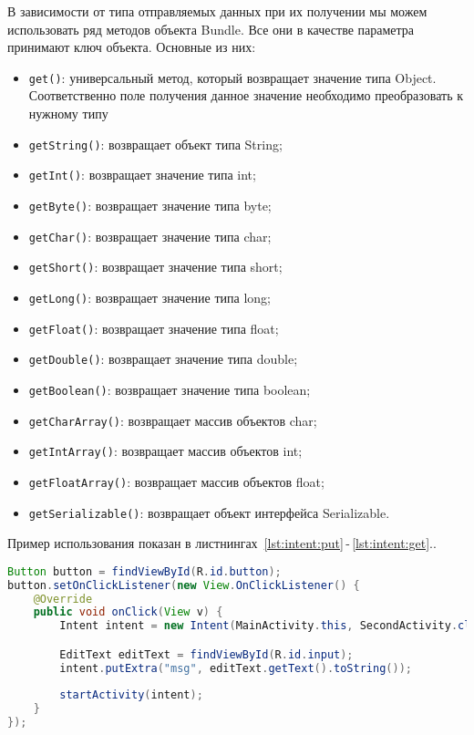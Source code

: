 В зависимости от типа отправляемых данных при их получении мы можем
использовать ряд методов объекта Bundle. Все они в качестве параметра
принимают ключ объекта. Основные из них:
\begin{itemize}
	\item \texttt{get()}: универсальный метод, который возвращает значение типа
		Object. Соответственно поле получения данное значение необходимо
		преобразовать к нужному типу
	\item \texttt{getString()}: возвращает объект типа String;
	\item \texttt{getInt()}: возвращает значение типа int;
	\item \texttt{getByte()}: возвращает значение типа byte;
	\item \texttt{getChar()}: возвращает значение типа char;
	\item \texttt{getShort()}: возвращает значение типа short;
	\item \texttt{getLong()}: возвращает значение типа long;
	\item \texttt{getFloat()}: возвращает значение типа float;
	\item \texttt{getDouble()}: возвращает значение типа double;
	\item \texttt{getBoolean()}: возвращает значение типа boolean;
	\item \texttt{getCharArray()}: возвращает массив объектов char;
	\item \texttt{getIntArray()}: возвращает массив объектов int;
	\item \texttt{getFloatArray()}: возвращает массив объектов float;
	\item \texttt{getSerializable()}: возвращает объект
		интерфейса Serializable.
\end{itemize}

Пример использования показан в
листнингах~\ref{lst:intent:put}\,-\,\ref{lst:intent:get}..

\begin{lstlisting}[language=Java
	, caption=\leftline{}
	, label=lst:intent:put
	]
Button button = findViewById(R.id.button);
button.setOnClickListener(new View.OnClickListener() {
	@Override
	public void onClick(View v) {
		Intent intent = new Intent(MainActivity.this, SecondActivity.class);

		EditText editText = findViewById(R.id.input);
		intent.putExtra("msg", editText.getText().toString());
		
		startActivity(intent);
	}
});
\end{lstlisting}

